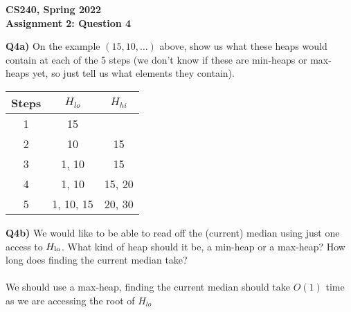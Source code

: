 \documentclass[12pt]{article}
\begin{document}
\begin{center}
{\Large\textbf{CS240, Spring 2022}}\\
\vspace{2mm}
{\Large\textbf{Assignment 2: Question 4}}\\
\vspace{3mm}
\end{center}
\[ \]
\textbf{Q4a)} On the example $(15,10,\dots)$ above, show us what these heaps would contain at each of the 5 steps (we don't know if these are min-heaps or
max-heaps yet, so just tell us what elements they contain).\\
\begin{adjustwidth}{0em}{0pt}
\begin{center}
\begin{tabular}{|c | c | c |} 
 \hline
 Steps & $H_{lo}$ & $H_{hi}$ \\ [0.5ex] 
 \hline\hline
 1 & 15 &  \\ 
 \hline
 2 & 10 & 15 \\
 \hline
 3 & 1, 10 & 15\\
 \hline
 4 & 1, 10 & 15, 20 \\
 \hline
 5 & 1, 10, 15 & 20, 30 \\ [1ex] 
 \hline
\end{tabular}
\end{center}

\end{adjustwidth} 

\begin{adjustwidth}{0em}{0pt}
\textbf{Q4b)} We would like to be able to read off the (current) median using just one access to $H_{\rm lo}$. What kind of heap should it be, a min-heap or a max-heap? How long does finding the current median take? \\ \\
We should use a max-heap, finding the current median should take $O(1)$ time as we are accessing the root of $H_{lo}$


\end{adjustwidth} 
\end{document}
